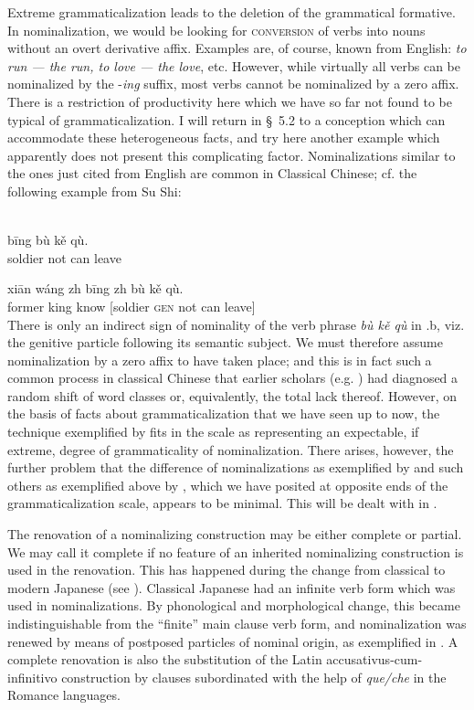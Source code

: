 Extreme grammaticalization leads to the deletion of the grammatical formative. In nominalization, we would be looking for \textsc{conversion} of verbs into nouns without an overt derivative affix. Examples are, of course, known from English: \textit{to run — the run, to love — the love}, etc. However, while virtually all verbs can be nominalized by the -\textit{ing} suffix, most verbs cannot be nominalized by a zero affix. There is a restriction of productivity here which we have so far not found to be typical of grammaticalization. I will return in §~5.2 to a conception which can accommodate these heterogeneous facts, and try here another example which apparently does not present this complicating factor. Nominalizations similar to the ones just cited from English are common in Classical Chinese; cf. the following example from Su Shi:

\ea\label{ex:E31}
\\
 \ea
 \gll b\=ing  bù  kě  qù.\\
 soldier  not  can  leave\\

\ex
\gll xi\=an  wáng  zh  b\=ing  zh  bù  kě  qù.\\
   former  king  know  [soldier  \textsc{gen}  not  can  leave]\\
\z
\z
\noindent There is only an indirect sign of nominality of the verb phrase \textit{bù kě qù} in .b, viz. the genitive particle following its semantic subject. We must therefore assume nominalization by a zero affix to have taken place; and this is in fact such a common process in classical Chinese that earlier scholars (e.g. \citet{Misteli1893}) had diagnosed a random shift of word classes or, equivalently, the total lack thereof. However, on the basis of facts about grammaticalization that we have seen up to now, the technique exemplified by  fits in the scale as representing an expectable, if extreme, degree of grammaticality of nominalization. There arises, however, the further problem that the difference of nominalizations as exemplified by  and such others as exemplified above by , which we have posited at opposite ends of the grammaticalization scale, appears to be minimal. This will be dealt with in .

The renovation of a nominalizing construction may be either complete or partial. We may call it complete if no feature of an inherited nominalizing construction is used in the renovation. This has happened during the change from classical to modern Japanese (see \citealt[45f]{Bossong1979}). Classical Japanese had an infinite verb form which was used in nominalizations. By phonological and morphological change, this became indistinguishable from the “finite” main clause verb form, and nominalization was renewed by means of postposed particles of nominal origin, as exemplified in . A complete renovation is also the substitution of the Latin accusativus-cum-infinitivo construction by clauses subordinated with the help of \textit{que/che} in the Romance languages.

